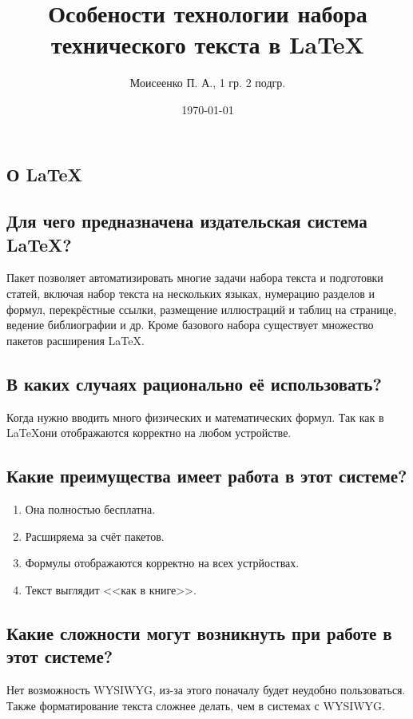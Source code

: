 \documentclass[a4paper,12pt]{article} %
\author{Моисеенко П. А., 1 гр. 2 подгр.}
\title{Особености технологии набора технического текста в \LaTeX{}}
\date{\today}
\begin{document}
\maketitle
\newpage
\begin{center}
\section{О \LaTeX}
\end{center}
\subsection{Для чего предназначена издательская система \LaTeX?}
Пакет позволяет автоматизировать многие задачи набора текста и подготовки статей, включая набор текста на нескольких языках, нумерацию разделов и формул, перекрёстные ссылки, размещение иллюстраций и таблиц на странице, ведение библиографии и др. Кроме базового набора существует множество пакетов расширения \LaTeX.
\subsection{В каких случаях рационально её использовать?}
\begin{flushright}
Когда нужно вводить много физических и математических формул. Так как в \LaTeX они отображаются корректно на любом устройстве.
\end{flushright}
\subsection{Какие преимущества имеет работа в этот системе?}
\begin{flushleft}
\begin{enumerate}
\item Она {\Large полностью бесплатна}.
\item Расширяема за счёт пакетов.
\item Формулы отображаются корректно на всех устрйоствах.
\item Текст выглядит <<как в книге>>.
\end{enumerate}
\end{flushleft}
\subsection{Какие сложности могут возникнуть при работе в этот системе?}
Нет возможность WYSIWYG, из-за этого поначалу будет неудобно пользоваться. Также форматирование текста сложнее делать, чем в системах с WYSIWYG.
\end{document}
